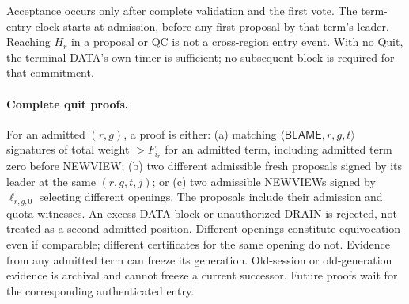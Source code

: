 \documentclass[11pt,a4paper]{article}
\newcommand{\tagg}[1]{\ensuremath{\mathsf{#1}}}
\begin{document}
Acceptance occurs only after complete validation and the first vote.
The term-entry clock starts at admission, before any first proposal by
that term's leader. Reaching $H_r$ in a proposal or QC is not a cross-region
entry event. With no Quit, the terminal DATA's own timer is sufficient;
no subsequent block is required for that commitment.

\paragraph{Complete quit proofs.}
For an admitted $(r,g)$, a proof is either: (a) matching
$\langle\tagg{BLAME},r,g,t\rangle$ signatures of total weight
$>F_{i_r}$ for an admitted term, including admitted term zero before
NEWVIEW; (b) two different admissible fresh
proposals signed by its leader at the same $(r,g,t,j)$; or (c) two
admissible NEWVIEWs signed by $\ell_{r,g,0}$ selecting different openings.
The proposals include their admission and quota witnesses. An excess
DATA block or unauthorized DRAIN is rejected, not treated as a second
admitted position. Different openings constitute equivocation even if
comparable; different certificates for the same opening do not.
Evidence from any admitted term can freeze its generation. Old-session
or old-generation evidence is archival and cannot freeze a current
successor. Future proofs wait for the corresponding authenticated entry.
\end{document}
